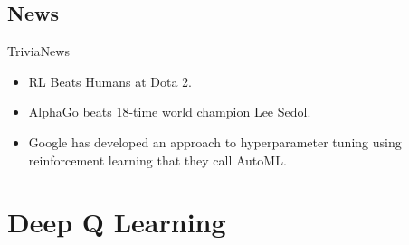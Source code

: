 \documentclass[10pt]{beamer}
\begin{document}
\subsection{News}
\begin{frame}{Trivia}{News}
  \begin{itemize}
    \item RL Beats Humans at Dota 2. \href{https://www.youtube.com/watch?time_continue=4&v=UZHTNBMAfAA}{}
    \item AlphaGo beats 18-time world champion Lee Sedol. \href{https://www.youtube.com/watch?v=l7ngy56GY6k}{}
    \item Google has developed an approach to hyperparameter tuning using reinforcement learning that they call AutoML. \href{https://cloud.google.com/automl/}{}
    
  \end{itemize}
\end{frame}

\section{Deep Q Learning}
\end{document}

